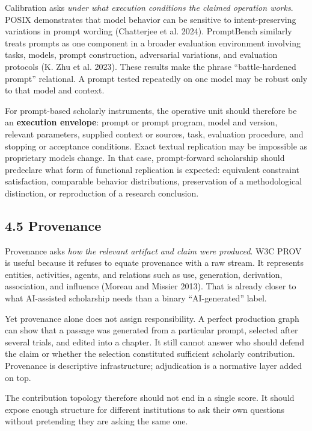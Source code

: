 \documentclass[
]{article}
\begin{document}
Calibration asks \emph{under what execution conditions the claimed
operation works}. POSIX demonstrates that model behavior can be
sensitive to intent-preserving variations in prompt wording (Chatterjee
et al. 2024). PromptBench similarly treats prompts as one component in a
broader evaluation environment involving tasks, models, prompt
construction, adversarial variations, and evaluation protocols (K. Zhu
et al. 2023). These results make the phrase ``battle-hardened prompt''
relational. A prompt tested repeatedly on one model may be robust only
to that model and context.

For prompt-based scholarly instruments, the operative unit should
therefore be an \textbf{execution envelope}: prompt or prompt program,
model and version, relevant parameters, supplied context or sources,
task, evaluation procedure, and stopping or acceptance conditions. Exact
textual replication may be impossible as proprietary models change. In
that case, prompt-forward scholarship should predeclare what form of
functional replication is expected: equivalent constraint satisfaction,
comparable behavior distributions, preservation of a methodological
distinction, or reproduction of a research conclusion.

\subsection{4.5 Provenance}\label{provenance}

Provenance asks \emph{how the relevant artifact and claim were
produced}. W3C PROV is useful because it refuses to equate provenance
with a raw stream. It represents entities, activities, agents, and
relations such as use, generation, derivation, association, and
influence (Moreau and Missier 2013). That is already closer to what
AI-assisted scholarship needs than a binary ``AI-generated'' label.

Yet provenance alone does not assign responsibility. A perfect
production graph can show that a passage was generated from a particular
prompt, selected after several trials, and edited into a chapter. It
still cannot answer who should defend the claim or whether the selection
constituted sufficient scholarly contribution. Provenance is descriptive
infrastructure; adjudication is a normative layer added on top.

The contribution topology therefore should not end in a single score. It
should expose enough structure for different institutions to ask their
own questions without pretending they are asking the same one.
\end{document}
